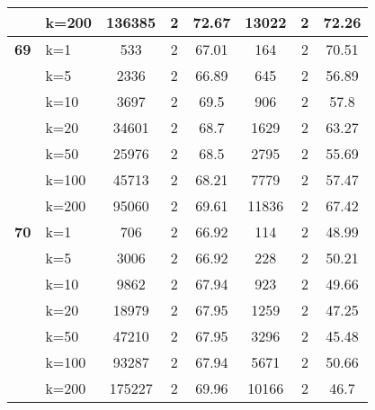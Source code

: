 \begin{table}[htbp]
\begin{tabular}{|l|l|c|c|c|c|c|c|}
     & k=200 & 136385 & 2 & 72.67 & 13022 & 2 & 72.26 \\ \hline
    \multicolumn{1}{|r|}{\textbf{69}} & k=1 & 533 & 2 & 67.01 & 164 & 2 & 70.51 \\ 
     & k=5 & 2336 & 2 & 66.89 & 645 & 2 & 56.89 \\ 
     & k=10 & 3697 & 2 & 69.5 & 906 & 2 & 57.8 \\ 
     & k=20 & 34601 & 2 & 68.7 & 1629 & 2 & 63.27 \\ 
     & k=50 & 25976 & 2 & 68.5 & 2795 & 2 & 55.69 \\ 
     & k=100 & 45713 & 2 & 68.21 & 7779 & 2 & 57.47 \\ 
     & k=200 & 95060 & 2 & 69.61 & 11836 & 2 & 67.42 \\ \hline
    \multicolumn{1}{|r|}{\textbf{70}} & k=1 & 706 & 2 & 66.92 & 114 & 2 & 48.99 \\ 
     & k=5 & 3006 & 2 & 66.92 & 228 & 2 & 50.21 \\ 
     & k=10 & 9862 & 2 & 67.94 & 923 & 2 & 49.66 \\ 
     & k=20 & 18979 & 2 & 67.95 & 1259 & 2 & 47.25 \\ 
     & k=50 & 47210 & 2 & 67.95 & 3296 & 2 & 45.48 \\ 
     & k=100 & 93287 & 2 & 67.94 & 5671 & 2 & 50.66 \\ 
     & k=200 & 175227 & 2 & 69.96 & 10166 & 2 & 46.7 \\ \hline
    \end{tabular}
\end{table}
